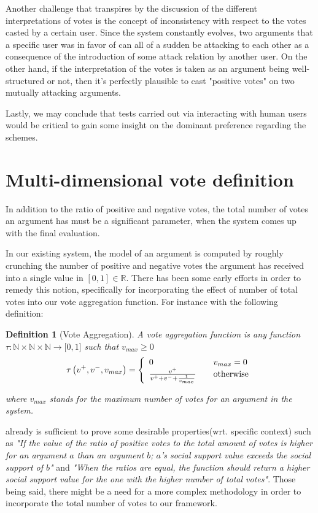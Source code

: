 \documentclass{article}
\newtheorem{definition}{Definition}
\begin{document}
Another challenge that transpires by the discussion of the different interpretations of votes is the concept of inconsistency with respect to the votes casted by a certain user. Since the system constantly evolves, two arguments that a specific user was in favor of can all of a sudden be attacking to each other as a consequence of the introduction of some attack relation by another user. On the other hand, if the interpretation of the votes is taken as an argument being well-structured or not, then it's perfectly plausible to cast "positive votes" on two mutually attacking arguments.

Lastly, we may conclude that tests carried out via interacting with human users would be critical to gain some insight on the dominant preference regarding the  schemes. 



\section{Multi-dimensional vote definition}
\label{mulDim}
In addition to the ratio of positive and negative votes, the total number of votes an argument has must be a significant parameter, when the system comes up with the final evaluation.

 In our existing system, the model of an argument is computed by roughly crunching  the number of positive and negative votes the argument has received into a single value in  $[0,1] \in \mathbb{R}$. There has been some early efforts in order to remedy this notion, specifically for incorporating the effect of number of total votes into our vote aggregation function. For instance with the following definition:

\begin{definition}
[Vote Aggregation]A vote aggregation function is any function
$\tau:
\mathbb{N} \times \mathbb{N} \times \mathbb{N}
\rightarrow\lbrack0,1]$ such that $v_{max}\geq0$
\[
\tau\left(  v^{+},v^{-}, v_{max}\right)  =\left\{
\begin{array}
[c]{lll}
0 &  & v_{max}=0\\
\frac{v^{+}}{v^{+}+v^{-}+\frac{1}{v_{max}}} &  & \text{otherwise}
\end{array}
\right.
\]

where $v_{max}$ stands for the maximum number of votes for an argument in the system.
\end{definition}

already is sufficient to prove some desirable properties(wrt. specific context) such as \textit{"If the value of the ratio of positive votes to the total amount of votes is higher for an argument $a$ than an argument $b$; $a$'s social support value exceeds the social support of $b$"} and \textit{"When the ratios are equal, the function should return a higher social support value for the one with the higher number of total votes"}. Those being said, there might be a need for a more complex methodology in order to incorporate the total number of votes to our framework.
\end{document}
